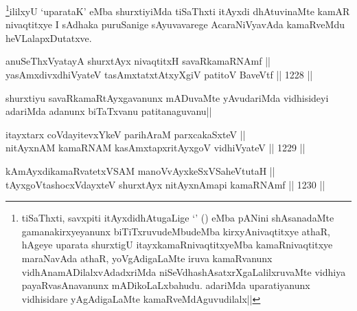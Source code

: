 \begin{artha}
\footnote{tiSaThxti, savxpiti itAyxdidhAtugaLige `\stext' (\stext) eMba pANini shAsanadaMte gamanakirxyeyanunx biTiTxruvudeMbudeMba kirxyAnivaqtitxye athaR, hAgeye uparata shurxtigU itayxkamaRnivaqtitxyeMba kamaRnivaqtitxye maraNavAda athaR, yoVgAdigaLaMte iruva kamaRvanunx vidhAnamADilalxvAdadxriMda niSeVdhashAsatxrXgaLalilxruvaMte vidhiya payaRvasAnavanunx mADikoLaLxbahudu. adariMda uparatiyanunx vidhisidare yAgAdigaLaMte kamaRveMdAguvudilalx||}ililxyU `uparataK' eMba shurxtiyiMda tiSaThxti itAyxdi dhAtuvinaMte kamAR nivaqtitxye I sAdhaka puruSanige sAyuvavarege AcaraNiVyavAda kamaRveMdu heVLalapxDutatxve.
\end{artha}


\begin{shl}
anuSeThxVyatayA shurxtAyx nivaqtitxH savaRkamaRNAmf || \\
yasAmxdivxdhiVyateV tasAmxtatxtAtxyXgiV patitoV BaveVtf ||  1228 ||  
\end{shl}

\begin{artha}
shurxtiyu savaRkamaRtAyxgavanunx mADuvaMte yAvudariMda vidhisideyi adariMda adanunx biTaTxvanu patitanaguvanu||
\end{artha}



\begin{shl}
itayxtarx coVdayitevxYkeV parihAraM parxcakaSxteV || \\
nitAyxnAM kamaRNAM kasAmxtapxritAyxgoV vidhiVyateV ||  1229 ||  
\end{shl}
				
\begin{shl}
kAmAyxdikamaRvatetxVSAM manoVvAyxkeSxVSaheVtutaH || \\
tAyxgoV\s tashocxVdayxteV shurxtAyx nitAyxnAmapi kamaRNAmf ||  1230 ||  
\end{shl}

